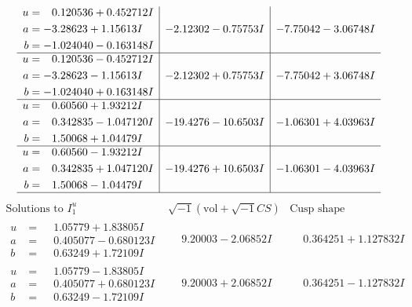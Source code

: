 \documentclass[1p]{elsarticle_modified}
\theoremstyle{definition}
\newcommand{\I}{\sqrt{-1}}
\begin{document}
$$\begin{array}{c|c|c}
\begin{aligned}
u &= \phantom{-}0.120536 + 0.452712 I \\
a &= -3.28623 + 1.15613 I \\
b &= -1.024040 - 0.163148 I\end{aligned}
 & -2.12302 - 0.75753 I & -7.75042 - 3.06748 I \\ \hline\begin{aligned}
u &= \phantom{-}0.120536 - 0.452712 I \\
a &= -3.28623 - 1.15613 I \\
b &= -1.024040 + 0.163148 I\end{aligned}
 & -2.12302 + 0.75753 I & -7.75042 + 3.06748 I \\ \hline\begin{aligned}
u &= \phantom{-}0.60560 + 1.93212 I \\
a &= \phantom{-}0.342835 - 1.047120 I \\
b &= \phantom{-}1.50068 + 1.04479 I\end{aligned}
 & -19.4276 - 10.6503 I & -1.06301 + 4.03963 I \\ \hline\begin{aligned}
u &= \phantom{-}0.60560 - 1.93212 I \\
a &= \phantom{-}0.342835 + 1.047120 I \\
b &= \phantom{-}1.50068 - 1.04479 I\end{aligned}
 & -19.4276 + 10.6503 I & -1.06301 - 4.03963 I\\
 \hline 
 \end{array}$$\newpage$$\begin{array}{c|c|c}  
\text{Solutions to }I^u_{1}& \I (\text{vol} + \sqrt{-1}CS) & \text{Cusp shape}\\
 \hline 
\begin{aligned}
u &= \phantom{-}1.05779 + 1.83805 I \\
a &= \phantom{-}0.405077 - 0.680123 I \\
b &= \phantom{-}0.63249 + 1.72109 I\end{aligned}
 & \phantom{-}9.20003 - 2.06852 I & \phantom{-}0.364251 + 1.127832 I \\ \hline\begin{aligned}
u &= \phantom{-}1.05779 - 1.83805 I \\
a &= \phantom{-}0.405077 + 0.680123 I \\
b &= \phantom{-}0.63249 - 1.72109 I\end{aligned}
 & \phantom{-}9.20003 + 2.06852 I & \phantom{-}0.364251 - 1.127832 I \\ \hline\begin{aligned}

\end{aligned}
\end{array}$$
\end{document}
